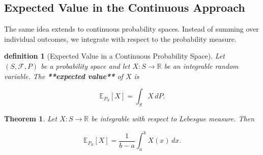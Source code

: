 \documentclass[10pt,a4paper]{book}
\newtheorem{definition}{definition}[section]
\newtheorem{theorem}{Theorem}[section]
\begin{document}
\subsection{Expected Value in the Continuous Approach}

The same idea extends to continuous probability spaces. Instead of summing over individual outcomes, we integrate with respect to the probability measure.

\begin{definition}[Expected Value in a Continuous Probability Space]

    Let $(S,\mathcal F,P)$ be a probability space and let $X:S\to\mathbb R$ be an integrable random variable. The \textbf{**expected value**} of $X$ is

    $$
        \mathbb E_{P_S}[X]
        =
        \int_S X\,dP.
    $$

\end{definition}




\begin{theorem}

    Let $X:S\to\mathbb R$ be integrable with respect to Lebesgue measure. Then

    $$
        \mathbb E_{P_S}[X]
        =
        \frac{1}{b-a}\int_a^b X(x)\,dx.
    $$

\end{theorem}
\end{document}
